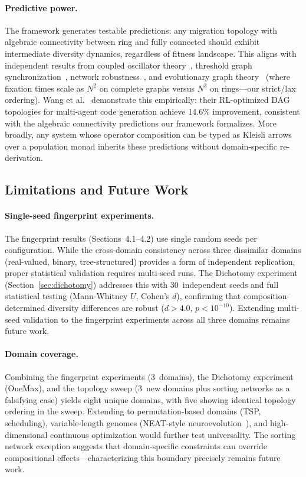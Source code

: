 \documentclass[sigconf,anonymous]{acmart}
\begin{document}
\paragraph{Predictive power.}
The framework generates testable predictions: any migration topology with algebraic connectivity between ring and fully connected should exhibit intermediate diversity dynamics, regardless of fitness landscape. This aligns with independent results from coupled oscillator theory~\cite{sanz2026algebraic}, threshold graph synchronization~\cite{wu2025threshold}, network robustness~\cite{ostilli2025topological}, and evolutionary graph theory~\cite{brewster2025evolutionary} (where fixation times scale as $N^2$ on complete graphs versus $N^3$ on rings---our strict/lax ordering). Wang et al.~\cite{wang2026agentconductor} demonstrate this empirically: their RL-optimized DAG topologies for multi-agent code generation achieve 14.6\% improvement, consistent with the algebraic connectivity predictions our framework formalizes. More broadly, any system whose operator composition can be typed as Kleisli arrows over a population monad inherits these predictions without domain-specific re-derivation.

\subsection{Limitations and Future Work}
\label{sec:limitations}

\paragraph{Single-seed fingerprint experiments.}
The fingerprint results (Sections~4.1--4.2) use single random seeds per configuration. While the cross-domain consistency across three dissimilar domains (real-valued, binary, tree-structured) provides a form of independent replication, proper statistical validation requires multi-seed runs. The Dichotomy experiment (Section~\ref{sec:dichotomy}) addresses this with 30~independent seeds and full statistical testing (Mann-Whitney $U$, Cohen's $d$), confirming that composition-determined diversity differences are robust ($d > 4.0$, $p < 10^{-10}$). Extending multi-seed validation to the fingerprint experiments across all three domains remains future work.

\paragraph{Domain coverage.}
Combining the fingerprint experiments (3~domains), the Dichotomy experiment (OneMax), and the topology sweep (3~new domains plus sorting networks as a falsifying case) yields eight unique domains, with five showing identical topology ordering in the sweep. Extending to permutation-based domains (TSP, scheduling), variable-length genomes (NEAT-style neuroevolution~\cite{eiben2015introduction}), and high-dimensional continuous optimization would further test universality. The sorting network exception suggests that domain-specific constraints can override compositional effects---characterizing this boundary precisely remains future work.
\end{document}
